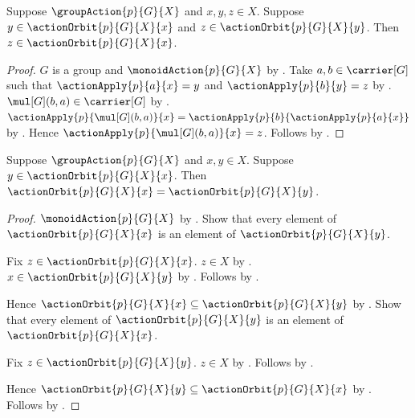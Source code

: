 \begin{proposition}\label{group_action_orbit_transitive}
    Suppose $\groupAction{p}{G}{X}$ and $x,y,z\in X$.
    Suppose $y\in\actionOrbit{p}{G}{X}{x}$ and
        $z\in\actionOrbit{p}{G}{X}{y}$.
    Then $z\in\actionOrbit{p}{G}{X}{x}$.
\end{proposition}
\begin{proof}
    $G$ is a group and $\monoidAction{p}{G}{X}$ by
        .
    Take $a,b\in\carrier[G]$ such that
        $\actionApply{p}{a}{x}=y$ and
        $\actionApply{p}{b}{y}=z$ by .
    $\mul[G](b,a)\in\carrier[G]$ by
        .
    $\actionApply{p}{\mul[G](b,a)}{x}
        =\actionApply{p}{b}{\actionApply{p}{a}{x}}$ by
        .
    Hence $\actionApply{p}{\mul[G](b,a)}{x}=z$.
    Follows by .
\end{proof}

\begin{theorem}\label{group_action_orbit_eq_if_member}
    Suppose $\groupAction{p}{G}{X}$ and $x,y\in X$.
    Suppose $y\in\actionOrbit{p}{G}{X}{x}$.
    Then
        $\actionOrbit{p}{G}{X}{x}=\actionOrbit{p}{G}{X}{y}$.
\end{theorem}
\begin{proof}
    $\monoidAction{p}{G}{X}$ by
        .
    Show that every element of $\actionOrbit{p}{G}{X}{x}$ is an
        element of $\actionOrbit{p}{G}{X}{y}$.
    \begin{subproof}
        Fix $z\in\actionOrbit{p}{G}{X}{x}$.
        $z\in X$ by .
        $x\in\actionOrbit{p}{G}{X}{y}$ by
            .
        Follows by .
    \end{subproof}
    Hence $\actionOrbit{p}{G}{X}{x}\subseteq
        \actionOrbit{p}{G}{X}{y}$ by .
    Show that every element of $\actionOrbit{p}{G}{X}{y}$ is an
        element of $\actionOrbit{p}{G}{X}{x}$.
    \begin{subproof}
        Fix $z\in\actionOrbit{p}{G}{X}{y}$.
        $z\in X$ by .
        Follows by .
    \end{subproof}
    Hence $\actionOrbit{p}{G}{X}{y}\subseteq
        \actionOrbit{p}{G}{X}{x}$ by .
    Follows by .
\end{proof}

